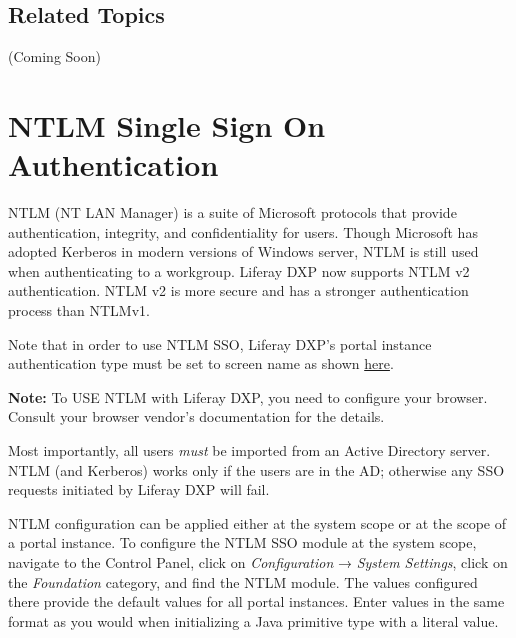 \subsection{Related Topics}\label{related-topics-8}

(Coming Soon)

\section{NTLM Single Sign On
Authentication}\label{ntlm-single-sign-on-authentication}

NTLM (NT LAN Manager) is a suite of Microsoft protocols that provide
authentication, integrity, and confidentiality for users. Though
Microsoft has adopted Kerberos in modern versions of Windows server,
NTLM is still used when authenticating to a workgroup. Liferay DXP now
supports NTLM v2 authentication. NTLM v2 is more secure and has a
stronger authentication process than NTLMv1.

Note that in order to use NTLM SSO, Liferay DXP's portal instance
authentication type must be set to screen name as shown
\href{/docs/7-0/user/-/knowledge_base/u/instance-settings\#authentication}{here}.

\noindent\hrulefill

\textbf{Note:} To USE NTLM with Liferay DXP, you need to configure your
browser. Consult your browser vendor's documentation for the details.

\noindent\hrulefill

Most importantly, all users \emph{must} be imported from an Active
Directory server. NTLM (and Kerberos) works only if the users are in the
AD; otherwise any SSO requests initiated by Liferay DXP will fail.

NTLM configuration can be applied either at the system scope or at the
scope of a portal instance. To configure the NTLM SSO module at the
system scope, navigate to the Control Panel, click on
\emph{Configuration} → \emph{System Settings}, click on the
\emph{Foundation} category, and find the NTLM module. The values
configured there provide the default values for all portal instances.
Enter values in the same format as you would when initializing a Java
primitive type with a literal value.

